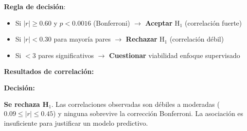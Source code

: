 \documentclass[12pt,letterpaper,twoside]{report}
\begin{document}
\begin{reglabox}
\textbf{Regla de decisión}:

\begin{itemize}[noitemsep]
    \item Si $|r| \geq 0.60$ y $p < 0.0016$ (Bonferroni) $\to$ \textbf{Aceptar} H$_1$ (correlación fuerte)
    \item Si $|r| < 0.30$ para mayoría pares $\to$ \textbf{Rechazar} H$_1$ (correlación débil)
    \item Si $< 3$ pares significativos $\to$ \textbf{Cuestionar} viabilidad enfoque supervisado
\end{itemize}
\end{reglabox}

\begin{calculobox}
\textbf{Resultados de correlación:}

\begin{table}[H]
\centering
\caption{Matriz de Correlación: Biométricos Agregados vs SF-36 ($N=10$)}
\label{tab:correlation_sf36}
\end{table}
\end{calculobox}

\begin{decisionbox}
\textbf{Decisión:}

\textbf{Se rechaza H$_1$}. Las correlaciones observadas son débiles a moderadas ($0.09 \leq |r| \leq 0.45$) y ninguna sobrevive la corrección Bonferroni. La asociación es insuficiente para justificar un modelo predictivo.
\end{decisionbox}
\end{document}
